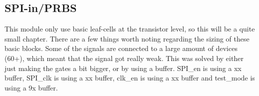 
\subsection{SPI-in/PRBS}
This module only use basic leaf-cells at the transistor level, so this will be a quite small chapter. There are a few things worth noting regarding the sizing of these basic blocks. Some of the signals are connected to a large amount of devices (60+), which meant that the signal got really weak. This was solved by either just making the gates a bit bigger, or by using a buffer. SPI\_en is using a xx buffer, SPI\_clk is using a xx buffer, clk\_en is using a xx buffer and test\_mode is using a 9x buffer.

